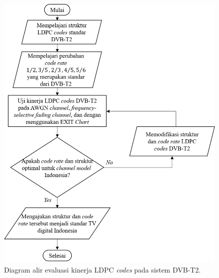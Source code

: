 \begin{figure}[tb]
	\centering
	\includegraphics[scale=0.8]
		{pics/diagram/alir.png}
		\caption{Diagram alir evaluasi kinerja LDPC \textit{codes} pada sistem DVB-T2.}
	\label{fig:Diagram Alir}
\end{figure}








